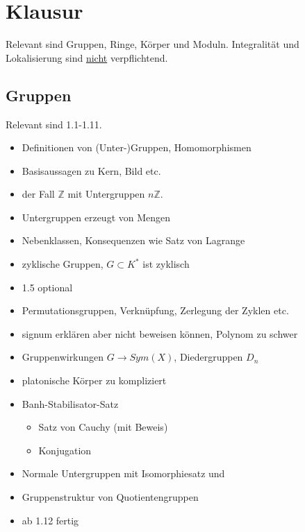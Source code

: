 \documentclass[a4paper, 12pt]{article}
\begin{document}
\section{Klausur}
Relevant sind Gruppen, Ringe, Körper und Moduln. Integralität und Lokalisierung sind \underline{nicht} verpflichtend.
\subsection{Gruppen}
Relevant sind 1.1-1.11.
\begin{itemize}
	\item Definitionen von (Unter-)Gruppen, Homomorphismen
	\item Basisaussagen zu Kern, Bild etc.
	\item der Fall $\mathbb{Z}$ mit Untergruppen $n\mathbb{Z}$.
	\item Untergruppen erzeugt von Mengen
	\item Nebenklassen, Konsequenzen wie Satz von Lagrange
	\item zyklische Gruppen, $G\subset K^*$ ist zyklisch
	\item 1.5 optional
	\item Permutationsgruppen, Verknüpfung, Zerlegung der Zyklen etc.
	\item signum erklären aber nicht beweisen können, Polynom zu schwer
	\item Gruppenwirkungen $G \to Sym(X)$, Diedergruppen $D_n$
	\item platonische Körper zu kompliziert
	\item Banh-Stabilisator-Satz
	\begin{itemize}
		\item Satz von Cauchy (mit Beweis)
		\item Konjugation
	\end{itemize}
	\item Normale Untergruppen mit Isomorphiesatz  und 
	\item Gruppenstruktur von Quotientengruppen
	\item ab 1.12 fertig
\end{itemize}
\end{document}
